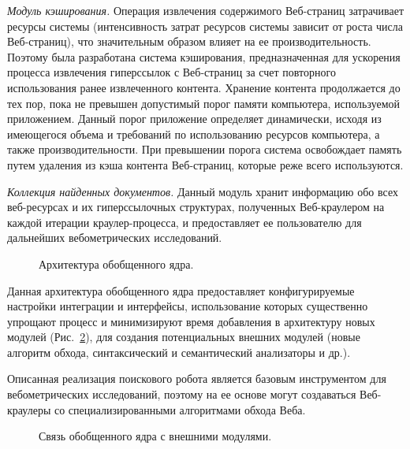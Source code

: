 \textit{Модуль кэширования.} Операция извлечения содержимого Веб-страниц затрачивает ресурсы системы (интенсивность затрат ресурсов системы зависит от роста числа Веб-страниц), что значительным образом влияет на ее производительность. Поэтому была разработана система кэширования, предназначенная для ускорения процесса извлечения гиперссылок с Веб-страниц за счет повторного использования ранее извлеченного контента. Хранение контента продолжается до тех пор, пока не превышен допустимый порог памяти компьютера, используемой приложением. Данный порог приложение определяет динамически, исходя из имеющегося объема и требований по использованию ресурсов компьютера, а также производительности. При превышении порога система освобождает память путем удаления из кэша контента Веб-страниц, которые реже всего используются.

\textit{Коллекция найденных документов.} Данный модуль хранит информацию обо всех веб-ресурсах и их гиперссылочных структурах, полученных Веб-краулером на каждой итерации краулер-процесса, и предоставляет ее пользователю для дальнейших вебометрических исследований.

\begin{figure}[ht]
	\caption{Архитектура обобщенного ядра.}\label{fig:kernelArchitecture}
\end{figure}

Данная архитектура обобщенного ядра предоставляет конфигурируемые настройки интеграции и интерфейсы, использование которых существенно упрощают процесс и минимизируют время добавления в архитектуру новых модулей (Рис.~\cref{fig:kernelModuleLink}), для создания потенциальных внешних модулей (новые алгоритм обхода, синтаксический и семантический анализаторы и др.).

Описанная реализация поискового робота является базовым инструментом для вебометрических исследований, поэтому на ее основе могут создаваться Веб-краулеры со специализированными алгоритмами обхода Веба.

\begin{figure}[ht]
	\caption{Связь обобщенного ядра с внешними модулями.}\label{fig:kernelModuleLink}
\end{figure}

